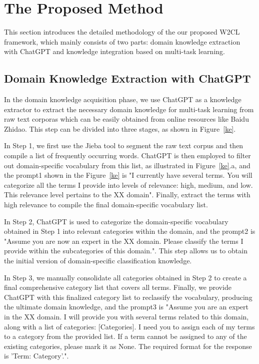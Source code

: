 \section{The Proposed Method}
\label{sec:method}
This section introduces the detailed methodology of the our proposed W2CL framework, which mainly consists of two parts: domain knowledge extraction with ChatGPT and knowledge integration based on multi-task learning.
\subsection{Domain Knowledge Extraction with ChatGPT}
In the domain knowledge acquisition phase, we use ChatGPT as a knowledge extractor to extract the necessary domain knowledge for multi-task learning from raw text corporas which can be easily obtained from online resources like Baidu Zhidao. This step can be divided into three stages, as shown in Figure~\ref{ke}.

In Step 1, we first use the Jieba tool to segment the raw text corpus and then compile a list of frequently occurring words. ChatGPT is then employed to filter out domain-specific vocabulary from this list, as illustrated in Figure~\ref{ke}.a, and the prompt1 shown in the Figure~\ref{ke} is "I currently have several terms. You will categorize all the terms I provide into levels of relevance: high, medium, and low. This relevance level pertains to the XX domain". Finally, extract the terms with high relevance to compile the final domain-specific vocabulary list.

In Step 2, ChatGPT is used to categorize the domain-specific vocabulary obtained in Step 1 into relevant categories within the domain, and the prompt2 is "Assume you are now an expert in the XX domain. Please classify the terms I provide within the subcategories of this domain.". This step allows us to obtain the initial version of domain-specific classification knowledge.

In Step 3, we manually consolidate all categories obtained in Step 2 to create a final comprehensive category list that covers all terms. Finally, we provide ChatGPT with this finalized category list to reclassify the vocabulary, producing the ultimate domain knowledge, and the prompt3 is "Assume you are an expert in the XX domain. I will provide you with several terms related to this domain, along with a list of categories: [Categories]. I need you to assign each of my terms to a category from the provided list. If a term cannot be assigned to any of the existing categories, please mark it as None. The required format for the response is 'Term: Category'.".

